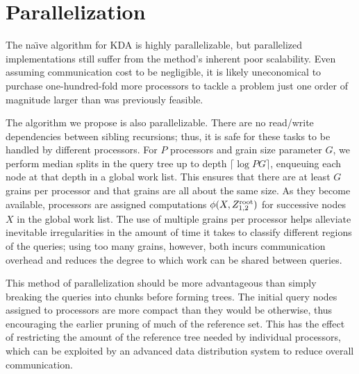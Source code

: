 \documentclass[twoside,leqno,twocolumn]{article}
\newcommand{\kdroot}[1]{#1^{\rm root}}
\begin{document}
\section{Parallelization}\label{sec:para}
The na\"{\i}ve algorithm for KDA is highly parallelizable, but
parallelized implementations still suffer from the method's inherent
poor scalability.  Even assuming communication cost to be negligible,
it is likely uneconomical to purchase one-hundred-fold more processors
to tackle a problem just one order of magnitude larger than was
previously feasible.

The algorithm we propose is also parallelizable.  There are no
read/write dependencies between sibling recursions; thus, it is safe
for these tasks to be handled by different processors.  For $P$
processors and grain size parameter $G$, we perform median splits in
the query tree up to depth $\lceil \log PG \rceil$, enqueuing each
node at that depth in a global work list.  This ensures that there are
at least $G$ grains per processor and that grains are all about the
same size.  As they become available, processors are assigned
computations $\phi(X,\kdroot{Z_{1,2}})$ for successive nodes $X$ in
the global work list.  The use of multiple grains per processor helps
alleviate inevitable irregularities in the amount of time it takes to
classify different regions of the queries; using too many grains,
however, both incurs communication overhead and reduces the degree to
which work can be shared between queries.

This method of parallelization should be more advantageous than simply
breaking the queries into chunks before forming trees.  The initial
query nodes assigned to processors are more compact than they would be
otherwise, thus encouraging the earlier pruning of much of the
reference set.  This has the effect of restricting the amount of the
reference tree needed by individual processors, which can be exploited
by an advanced data distribution system to reduce overall
communication.
\end{document}
